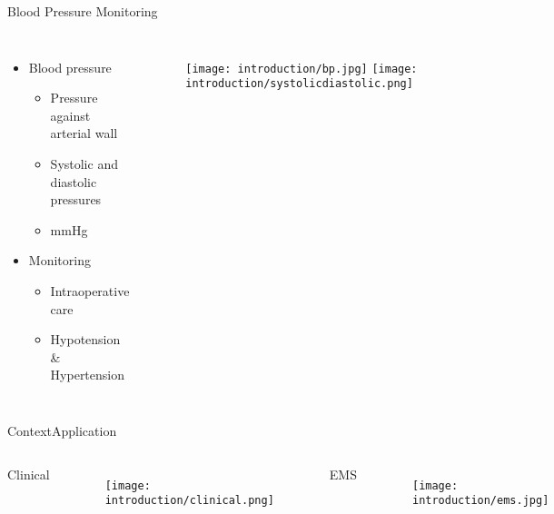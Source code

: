 \begin{frame}{Blood Pressure Monitoring}
    \begin{columns}
        \begin{itemize}

            \item Blood pressure
                  \begin{itemize}
                      \item Pressure against arterial wall
                      \item Systolic and diastolic pressures
                      \item mmHg
                  \end{itemize}


            \item Monitoring
                  \begin{itemize}
                      \item Intraoperative care
                      \item Hypotension \& Hypertension
                  \end{itemize}
        \end{itemize}

        \begin{figure}
            \centering
            \texttt{[image: introduction/bp.jpg]}
            \texttt{[image: introduction/systolicdiastolic.png]}
        \end{figure}
    \end{columns}


\end{frame}

\begin{frame}{Context}{Application}
    \begin{columns}
        \centering
        Clinical
        \begin{figure}
            \centering
            \texttt{[image: introduction/clinical.png]}
        \end{figure}

        \centering
        EMS
        \begin{figure}
            \centering
            \texttt{[image: introduction/ems.jpg]}
        \end{figure}
    \end{columns}
\end{frame}

